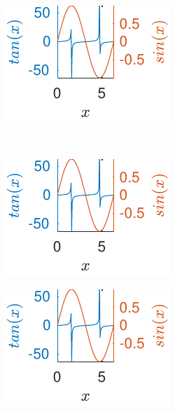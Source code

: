 \begin{figure}[H]
\begin{subfigure}[b]{\fourfig\textwidth}
		\end{subfigure}
		\hfil
		\begin{subfigure}[b]{\fourfig\textwidth} 
			\includegraphics{../matlab/fig/examples/tansin-with-ffsp.pdf}
		\end{subfigure}
		\\
		\begin{subfigure}[b]{\fourfig\textwidth} 
			\includegraphics{../matlab/fig/examples/tansin-with-ffsp.pdf}
		\end{subfigure}
		\hfil
		\begin{subfigure}[b]{\fourfig\textwidth} 
			\includegraphics{../matlab/fig/examples/tansin-with-ffsp.pdf}
		\end{subfigure}
		\hfil
		\begin{subfigure}[b]{\fourfig\textwidth} 

\end{subfigure}
\end{figure}
